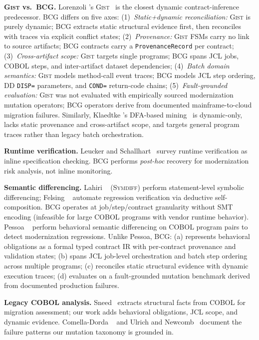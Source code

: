 \documentclass[sigconf,anonymous,review]{acmart}
\begin{document}
\textbf{\textsc{Gist} vs.\ BCG.}
Lorenzoli \etal's \textsc{Gist}~\cite{lorenzoli2008automatic} is the closest
dynamic contract-inference predecessor. BCG differs on five axes:
(1)~\emph{Static+dynamic reconciliation:} \textsc{Gist} is purely dynamic; BCG
extracts static structural evidence first, then reconciles with traces via explicit
conflict states;
(2)~\emph{Provenance:} \textsc{Gist} FSMs carry no link to source artifacts; BCG
contracts carry a \texttt{ProvenanceRecord} per contract;
(3)~\emph{Cross-artifact scope:} \textsc{Gist} targets single programs; BCG spans JCL
jobs, COBOL steps, and inter-artifact dataset dependencies;
(4)~\emph{Batch domain semantics:} \textsc{Gist} models method-call event traces; BCG
models JCL step ordering, DD \texttt{DISP=} parameters, and \texttt{COND=} return-code
chains;
(5)~\emph{Fault-grounded evaluation:} \textsc{Gist} was not evaluated with
empirically sourced modernization mutation operators; BCG operators derive from
documented mainframe-to-cloud migration failures.
Similarly, Klaedtke \etal's DFA-based mining~\cite{klaedtke2021mining} is dynamic-only,
lacks static provenance and cross-artifact scope, and targets general program
traces rather than legacy batch orchestration.

\textbf{Runtime verification.}
Leucker and Schallhart~\cite{leucker2009brief} survey runtime verification as
inline specification checking.
BCG performs \emph{post-hoc} recovery for modernization risk analysis, not
inline monitoring.

\textbf{Semantic differencing.}
Lahiri \etal~\cite{lahiri2012regression} (\textsc{Symdiff}) perform statement-level
symbolic differencing;
Felsing \etal~\cite{felsing2014automating} automate regression verification via
deductive self-composition.
BCG operates at job/step/contract granularity without SMT encoding (infeasible for
large COBOL programs with vendor runtime behavior).
Pessoa \etal~\cite{pessoa2022behavioral} perform behavioral semantic differencing on
COBOL program pairs to detect modernization regressions.
Unlike Pessoa, BCG: (a) represents behavioral obligations as a formal typed contract IR
with per-contract provenance and validation states; (b) spans JCL job-level orchestration
and batch step ordering across multiple programs; (c) reconciles static structural
evidence with dynamic execution traces; (d) evaluates on a fault-grounded mutation
benchmark derived from documented production failures.

\textbf{Legacy COBOL analysis.}
Sneed~\cite{sneed2008cobol} extracts structural facts from COBOL for migration
assessment; our work adds behavioral obligations, JCL scope, and dynamic evidence.
Comella-Dorda \etal~\cite{comella2000survey} and Ulrich and Newcomb~\cite{ulrich2010information}
document the failure patterns our mutation taxonomy is grounded in.
\end{document}
